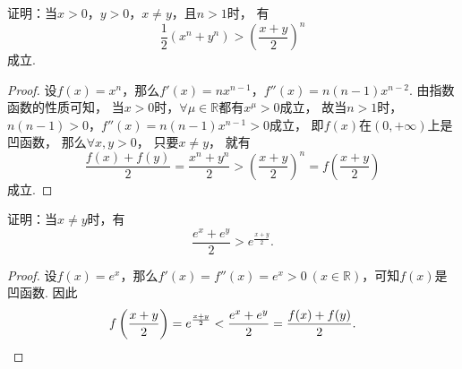 \begin{example}
证明：当\(x>0\)，\(y>0\)，\(x \neq y\)，且\(n>1\)时，
有\begin{equation}\label{equation:微分中值定理.平均数的比较1}
	\frac{1}{2} (x^n+y^n) > \left(\frac{x+y}{2}\right)^n
\end{equation}成立.
\begin{proof}
设\(f(x) = x^n\)，那么\(f'(x) = n x^{n-1}\)，\(f''(x) = n(n-1) x^{n-2}\).
由指数函数的性质可知，
当\(x > 0\)时，\(\forall \mu \in \mathbb{R}\)都有\(x^{\mu} > 0\)成立，
故当\(n > 1\)时，\(n(n-1)>0\)，\(f''(x) = n(n-1) x^{n-1} > 0\)成立，
即\(f(x)\)在\((0,+\infty)\)上是凹函数，
那么\(\forall x,y>0\)，
只要\(x \neq y\)，
就有\[
	\frac{f(x)+f(y)}{2} = \frac{x^n+y^n}{2}
	> \left(\frac{x+y}{2}\right)^n = f\left(\frac{x+y}{2}\right)
\]成立.
\end{proof}
\end{example}

\begin{example}
证明：当\(x \neq y\)时，有\begin{equation}
	\frac{e^x + e^y}{2} > e^{\frac{x+y}{2}}.
\end{equation}
\begin{proof}
设\(f(x) = e^x\)，那么\(f'(x) = f''(x) = e^x > 0\ (x\in\mathbb{R})\)，可知\(f(x)\)是凹函数.
因此\[
	f\left(\frac{x+y}{2}\right) = e^{\frac{x+y}{2}}
	< \frac{e^x+e^y}{2} = \frac{f(x)+f(y)}{2}.
	\qedhere
\]
\end{proof}
\end{example}
